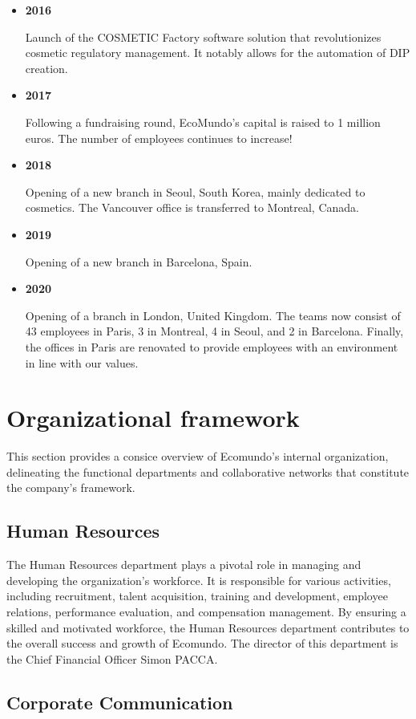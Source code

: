 \documentclass[a4paper,12pt,twoside]{report}
\begin{document}
\begin{itemize}
\item \textbf{2016}

Launch of the COSMETIC Factory software solution that revolutionizes cosmetic regulatory management. It notably allows for the automation of DIP creation.

\item \textbf{2017}

Following a fundraising round, EcoMundo's capital is raised to 1 million euros. The number of employees continues to increase!

\item \textbf{2018}

Opening of a new branch in Seoul, South Korea, mainly dedicated to cosmetics. The Vancouver office is transferred to Montreal, Canada.

\item \textbf{2019}

Opening of a new branch in Barcelona, Spain.

\item \textbf{2020}

Opening of a branch in London, United Kingdom. The teams now consist of 43 employees in Paris, 3 in Montreal, 4 in Seoul, and 2 in Barcelona. Finally, the offices in Paris are renovated to provide employees with an environment in line with our values.
\end{itemize}
\section{Organizational framework}
This section provides a consice overview of Ecomundo's internal organization, delineating the functional departments and collaborative networks that constitute the company's framework.
\subsection{Human Resources}

The Human Resources department plays a pivotal role in managing and developing the organization's workforce. It is responsible for various activities, including recruitment, talent acquisition, training and development, employee relations, performance evaluation, and compensation management. By ensuring a skilled and motivated workforce, the Human Resources department contributes to the overall success and growth of Ecomundo. The director of this department is the Chief Financial Officer Simon PACCA.

\subsection{Corporate Communication}
\end{document}
